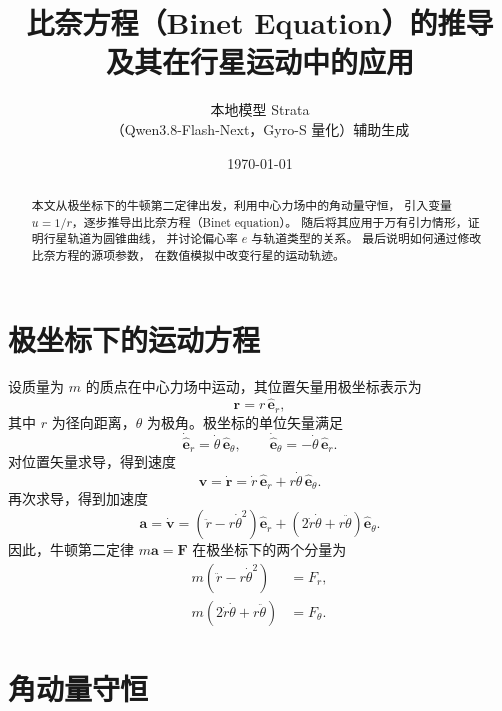 \documentclass[UTF8,a4paper,11pt]{ctexart}
\title{\textbf{比奈方程（Binet Equation）的推导\\及其在行星运动中的应用}}
\author{本地模型 Strata\\\small（Qwen3.8-Flash-Next，Gyro-S 量化）辅助生成}
\date{\today}
\begin{document}
\maketitle

\begin{abstract}
本文从极坐标下的牛顿第二定律出发，利用中心力场中的角动量守恒，
引入变量 \(u=1/r\)，逐步推导出比奈方程（Binet equation）。
随后将其应用于万有引力情形，证明行星轨道为圆锥曲线，
并讨论偏心率 \(e\) 与轨道类型的关系。
最后说明如何通过修改比奈方程的源项参数，
在数值模拟中改变行星的运动轨迹。
\end{abstract}

\tableofcontents
\newpage

\section{极坐标下的运动方程}

设质量为 \(m\) 的质点在中心力场中运动，其位置矢量用极坐标表示为
\begin{equation}
  \mathbf r = r\,\hat{\mathbf e}_r,
\end{equation}
其中 \(r\) 为径向距离，\(\theta\) 为极角。极坐标的单位矢量满足
\begin{equation}
  \dot{\hat{\mathbf e}}_r = \dot\theta\,\hat{\mathbf e}_\theta,
  \qquad
  \dot{\hat{\mathbf e}}_\theta = -\dot\theta\,\hat{\mathbf e}_r .
\end{equation}
对位置矢量求导，得到速度
\begin{equation}
  \mathbf v = \dot{\mathbf r}
  = \dot r\,\hat{\mathbf e}_r + r\dot\theta\,\hat{\mathbf e}_\theta .
\end{equation}
再次求导，得到加速度
\begin{equation}
  \mathbf a = \dot{\mathbf v}
  = \left(\ddot r - r\dot\theta^{2}\right)\hat{\mathbf e}_r
  + \left(2\dot r\dot\theta + r\ddot\theta\right)\hat{\mathbf e}_\theta .
\end{equation}
因此，牛顿第二定律 \(m\mathbf a=\mathbf F\) 在极坐标下的两个分量为
\begin{align}
  m\left(\ddot r - r\dot\theta^{2}\right) &= F_r, \label{eq:radial}\\
  m\left(2\dot r\dot\theta + r\ddot\theta\right) &= F_\theta . \label{eq:transverse}
\end{align}

\section{角动量守恒}
\end{document}

